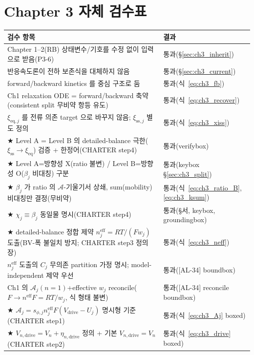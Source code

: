 \documentclass[11pt,a4paper]{article}
\newcommand{\eff}{\mathrm{eff}}
\newcommand{\eq}{\mathrm{eq}}
\newcommand{\drive}{\mathrm{drive}}
\newcommand{\sstat}{\mathrm{ss}}
\newcommand{\AL}[1]{\textsf{[AL-#1]}}
\begin{document}
\section{Chapter 3 자체 검수표}\label{sec:ch3_selfcheck}
{\small
\begin{longtable}{>{\raggedright\arraybackslash}p{} >{\raggedright\arraybackslash}p{}}
\toprule 검수 항목 & 결과 \\ \midrule \endhead
Chapter 1--2(RB) 상태변수/기호를 수정 없이 입력으로 받음(P3-6) & 통과(\S\ref{sec:ch3_inherit}) \\
반응속도론이 전하 보존식을 대체하지 않음 & 통과(\S\ref{sec:ch3_current}) \\
forward/backward kinetics 를 중심 구조로 둠 & 통과(식~\eqref{eq:ch3_fb}) \\
Ch1 relaxation ODE = forward/backward 축약(consistent split 무비약 항등 유도) & 통과(식~\eqref{eq:ch3_recover}) \\
$\xi_{\eq,j}$ 를 전류 의존 target 으로 바꾸지 않음; $\xi_{\sstat,j}$ 별도 정의 & 통과(식~\eqref{eq:ch3_xiss}) \\
★ Level A = Level B 의 detailed-balance 극한($\xi_\sstat\to\xi_\eq$) 검증 + 한정어(CHARTER step4) & 통과(verifybox) \\
★ Level A=방향성 X(ratio 불변) / Level B=방향성 O($\beta_j$ 비대칭) 구분 & 통과(keybox \S\ref{sec:ch3_split}) \\
★ $\beta_j$ 가 ratio 의 $\mathcal A$-기울기서 상쇄, sum(mobility) 비대칭만 결정(무비약) & 통과(식~\eqref{eq:ch3_ratio_B},\allowbreak\eqref{eq:ch3_ksum}) \\
★ $\chi_j\equiv\beta_j$ 동일물 명시(CHARTER step4) & 통과(\S 서, keybox, groundingbox) \\
★ detailed-balance 정합 제약 $n_j^{\eff}=RT/(Fw_j)$ 도출(BV-폭 불일치 방지; CHARTER step3 정의장) & 통과(식~\eqref{eq:ch3_neff}) \\
$n_j^{\eff}$ 도출의 $C_j$ 무의존 partition 가정 명시; model-independent 제약 우선 & 통과(\AL{34} boundbox) \\
Ch1 의 $\mathcal A_j(n{=}1)$+effective $w_j$ reconcile($F\to n^\eff F=RT/w_j$, 식 형태 불변) & 통과(\AL{34} reconcile boundbox) \\
★ $\mathcal A_j=s_{\phi,j}n_j^\eff F(V_\drive-U_j)$ 명시형 기준(CHARTER step1) & 통과(식~\eqref{eq:ch3_Aj} boxed) \\
★ $V_{n,\drive}=V_n+\eta_{n,\drive}$ 정의 + 기본 $V_{n,\drive}=V_n$(CHARTER step2) & 통과(식~\eqref{eq:ch3_drive} boxed) \\

\end{longtable}}
\end{document}
